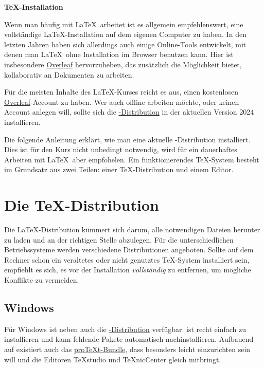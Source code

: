 \documentclass[
	ausgabe=2025-01-13,
	titel=Installationshinweise,
	shortverb=true,
]{../tex/latexkurs-exercise}
\begin{document}
\begin{center}
\sffamily\bfseries\Large \TeX-Installation
\end{center}

\noindent Wenn man häufig mit \LaTeX\ arbeitet ist es allgemein empfehlenswert, eine vollständige \LaTeX-Installation auf dem eigenen Computer zu haben. In den letzten Jahren haben sich allerdings auch einige Online-Tools entwickelt, mit denen man \LaTeX\ ohne Installation im Browser benutzen kann. Hier ist insbesondere \href{https://qn3.de/tex00}{Overleaf} hervorzuheben, das zusätzlich die Möglichkeit bietet, kollaborativ an Dokumenten zu arbeiten.

Für die meisten Inhalte des \LaTeX-Kurses reicht es aus, einen kostenlosen \href{https://qn3.de/tex00}{Overleaf}-Account zu haben. Wer auch offline arbeiten möchte, oder keinen Account anlegen will, sollte sich die \href{https://www.tug.org/texlive/}{\TeXlive-Distribution} in der aktuellen Version 2024 installieren.

Die folgende Anleitung erklärt, wie man eine aktuelle \TeXlive-Distribution installiert. Dies ist für den Kurs nicht unbedingt notwendig, wird für ein dauerhaftes Arbeiten mit \LaTeX\ aber empfohelen. Ein funktionierendes \TeX-System besteht im Grundsatz aus zwei Teilen: einer \TeX-Distribution und einem Editor.


\section{Die \TeX-Distribution}

Die \LaTeX-Distribution kümmert sich darum, alle notwendigen Dateien herunter zu laden und an der richtigen Stelle abzulegen. Für die unterschiedlichen Betriebssysteme werden verschiedene Distributionen angeboten. Sollte auf dem Rechner schon ein veraltetes oder nicht genutztes \TeX-System installiert sein, empfiehlt es sich, es vor der Installation \emph{vollständig} zu entfernen, um mögliche Konflikte zu vermeiden.

\subsection*{Windows}
Für Windows ist neben \href{https://www.tug.org/texlive/}{\TeXlive} auch die \href{https://miktex.org/}{\MikTeX-Distribution} verfügbar. \MikTeX ist recht einfach zu installieren und kann fehlende Pakete automatisch nachinstallieren. Aufbauend auf \MikTeX existiert auch das \href{https://www.tug.org/protext/}{pro\TeX t-Bundle}, dass besonders leicht einzurichten sein will und die Editoren \TeX studio und \TeX nicCenter gleich mitbringt.
\end{document}
